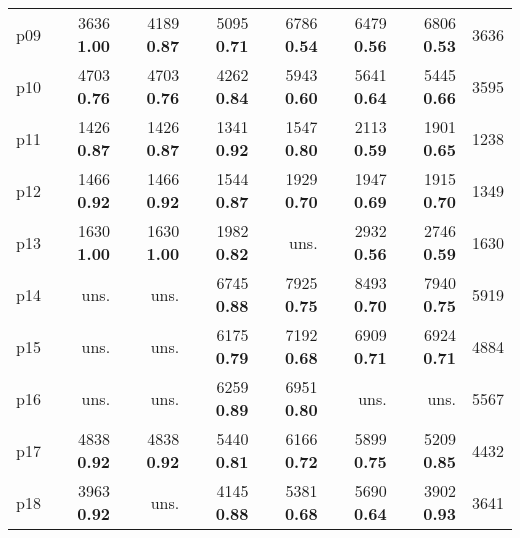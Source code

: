 \begin{tabular}{lrrrrrrr}
\multicolumn{1}{l|}{p09} & {\footnotesize 3636} \textbf{1.00} & {\footnotesize 4189} \textbf{0.87} & {\footnotesize 5095} \textbf{0.71} & {\footnotesize 6786} \textbf{0.54} & {\footnotesize 6479} \textbf{0.56} & {\footnotesize 6806} \textbf{0.53} & \multicolumn{1}{|r}{3636}\\
\multicolumn{1}{l|}{p10} & {\footnotesize 4703} \textbf{0.76} & {\footnotesize 4703} \textbf{0.76} & {\footnotesize 4262} \textbf{0.84} & {\footnotesize 5943} \textbf{0.60} & {\footnotesize 5641} \textbf{0.64} & {\footnotesize 5445} \textbf{0.66} & \multicolumn{1}{|r}{3595}\\
\multicolumn{1}{l|}{p11} & {\footnotesize 1426} \textbf{0.87} & {\footnotesize 1426} \textbf{0.87} & {\footnotesize 1341} \textbf{0.92} & {\footnotesize 1547} \textbf{0.80} & {\footnotesize 2113} \textbf{0.59} & {\footnotesize 1901} \textbf{0.65} & \multicolumn{1}{|r}{1238}\\
\multicolumn{1}{l|}{p12} & {\footnotesize 1466} \textbf{0.92} & {\footnotesize 1466} \textbf{0.92} & {\footnotesize 1544} \textbf{0.87} & {\footnotesize 1929} \textbf{0.70} & {\footnotesize 1947} \textbf{0.69} & {\footnotesize 1915} \textbf{0.70} & \multicolumn{1}{|r}{1349}\\
\multicolumn{1}{l|}{p13} & {\footnotesize 1630} \textbf{1.00} & {\footnotesize 1630} \textbf{1.00} & {\footnotesize 1982} \textbf{0.82} & uns. & {\footnotesize 2932} \textbf{0.56} & {\footnotesize 2746} \textbf{0.59} & \multicolumn{1}{|r}{1630}\\
\multicolumn{1}{l|}{p14} & uns. & uns. & {\footnotesize 6745} \textbf{0.88} & {\footnotesize 7925} \textbf{0.75} & {\footnotesize 8493} \textbf{0.70} & {\footnotesize 7940} \textbf{0.75} & \multicolumn{1}{|r}{5919}\\
\multicolumn{1}{l|}{p15} & uns. & uns. & {\footnotesize 6175} \textbf{0.79} & {\footnotesize 7192} \textbf{0.68} & {\footnotesize 6909} \textbf{0.71} & {\footnotesize 6924} \textbf{0.71} & \multicolumn{1}{|r}{4884}\\
\multicolumn{1}{l|}{p16} & uns. & uns. & {\footnotesize 6259} \textbf{0.89} & {\footnotesize 6951} \textbf{0.80} & uns. & uns. & \multicolumn{1}{|r}{5567}\\
\multicolumn{1}{l|}{p17} & {\footnotesize 4838} \textbf{0.92} & {\footnotesize 4838} \textbf{0.92} & {\footnotesize 5440} \textbf{0.81} & {\footnotesize 6166} \textbf{0.72} & {\footnotesize 5899} \textbf{0.75} & {\footnotesize 5209} \textbf{0.85} & \multicolumn{1}{|r}{4432}\\
\multicolumn{1}{l|}{p18} & {\footnotesize 3963} \textbf{0.92} & uns. & {\footnotesize 4145} \textbf{0.88} & {\footnotesize 5381} \textbf{0.68} & {\footnotesize 5690} \textbf{0.64} & {\footnotesize 3902} \textbf{0.93} & \multicolumn{1}{|r}{3641}\\

\end{tabular}
